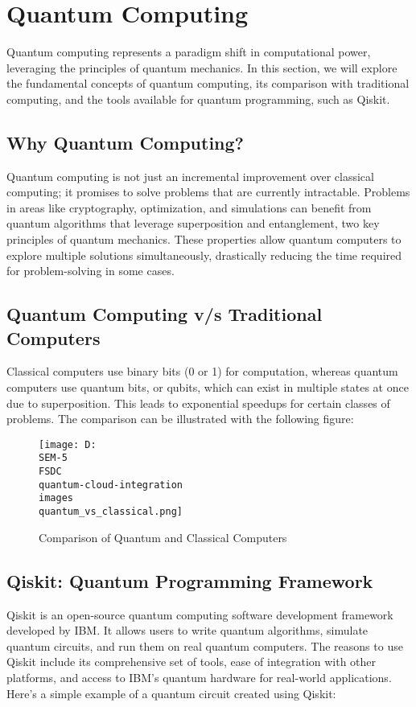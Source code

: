 \documentclass[12pt,a4paper]{article}
\begin{document}
\section{Quantum Computing}

Quantum computing represents a paradigm shift in computational power, leveraging the principles of quantum mechanics. In this section, we will explore the fundamental concepts of quantum computing, its comparison with traditional computing, and the tools available for quantum programming, such as Qiskit.

\subsection{Why Quantum Computing?}
Quantum computing is not just an incremental improvement over classical computing; it promises to solve problems that are currently intractable. Problems in areas like cryptography, optimization, and simulations can benefit from quantum algorithms that leverage superposition and entanglement, two key principles of quantum mechanics. These properties allow quantum computers to explore multiple solutions simultaneously, drastically reducing the time required for problem-solving in some cases.

\subsection{Quantum Computing v/s Traditional Computers}
Classical computers use binary bits (0 or 1) for computation, whereas quantum computers use quantum bits, or qubits, which can exist in multiple states at once due to superposition. This leads to exponential speedups for certain classes of problems. The comparison can be illustrated with the following figure:

\begin{figure}[h!]
    \centering
    \texttt{[image: D:\\SEM-5\\FSDC\\quantum-cloud-integration\\images\\quantum\_vs\_classical.png]}
    \caption{Comparison of Quantum and Classical Computers}
    \label{fig:quantum_vs_classical}
\end{figure}

\subsection{Qiskit: Quantum Programming Framework}
Qiskit is an open-source quantum computing software development framework developed by IBM. It allows users to write quantum algorithms, simulate quantum circuits, and run them on real quantum computers. The reasons to use Qiskit include its comprehensive set of tools, ease of integration with other platforms, and access to IBM's quantum hardware for real-world applications. Here's a simple example of a quantum circuit created using Qiskit:
\end{document}
